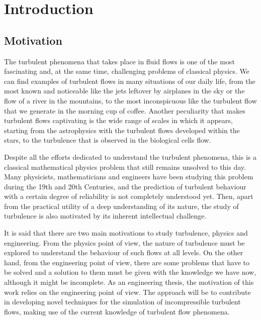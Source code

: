 
\chapter{Introduction}
\label{chap-Introduction}

\section{Motivation}

The turbulent phenomena that takes place in fluid flows is one of the most fascinating and, at the same time, challenging problems of classical physics. We can find examples of turbulent flows in many situations of our daily life, from the most known and noticeable like the jets leftover by airplanes in the sky or the flow of a river in the mountains, to the most inconspicuous like the turbulent flow that we generate in the morning cup of coffee. Another peculiarity that makes turbulent flows captivating is the wide range of scales in which it appears, starting from the astrophysics with the turbulent flows developed within the stars, to the turbulence that is observed in the biological cells flow.

Despite all the efforts dedicated to understand the turbulent phenomena, this is a classical mathematical physics problem that still remains unsolved to this day. Many physicists, mathematicians and engineers have been studying this problem during the 19th and 20th Centuries, and the prediction of turbulent behaviour with a certain degree of reliability is not completely understood yet. Then, apart from the practical utility of a deep understanding of its nature, the study of turbulence is also motivated by its inherent intellectual challenge.

It is said that there are two main motivations to study turbulence, physics and engineering. From the physics point of view, the nature of turbulence must be explored to understand the behaviour of such flows at all levels. On the other hand, from the engineering point of view, there are some problems that have to be solved and a solution to them must be given with the knowledge we have now, although it might be incomplete. As an engineering thesis, the motivation of this work relies on the engineering point of view. The approach will be to contribute in developing novel techniques for the simulation of incompressible turbulent flows, making use of the current knowledge of turbulent flow phenomena.

